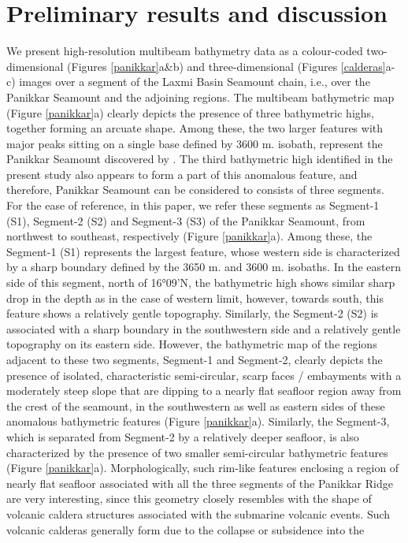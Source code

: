 \documentclass[twocolumn]{article}
\begin{document}
\section{Preliminary results and discussion}
We present high-resolution multibeam bathymetry data as a colour-coded two-dimensional (Figures \ref{panikkar}a\&b) and three-dimensional (Figures \ref{calderas}a-c) images over a segment of the Laxmi Basin Seamount chain, i.e., over the Panikkar Seamount and the adjoining regions. The multibeam bathymetric map (Figure \ref{panikkar}a) clearly depicts the presence of three bathymetric highs, together forming an arcuate shape. Among these, the two larger features with major peaks sitting on a single base defined by 3600 m. isobath, represent the Panikkar Seamount discovered by \cite{Bhattacharya1994b}. The third bathymetric high identified in the present study also appears to form a part of this anomalous feature, and therefore, Panikkar Seamount can be considered to consists of three segments. For the ease of reference, in this paper, we refer these segments as Segment-1 (S1), Segment-2 (S2) and Segment-3 (S3) of the Panikkar Seamount, from northwest to southeast, respectively (Figure \ref{panikkar}a). Among these, the Segment-1 (S1) represents the largest feature, whose western side is characterized by a sharp boundary defined by the 3650 m. and 3600 m. isobaths. In the eastern side of this segment, north of 16°09’N, the bathymetric high shows similar sharp drop in the depth as in the case of western limit, however, towards south, this feature shows a relatively gentle topography. Similarly, the Segment-2 (S2) is associated with a sharp boundary in the southwestern side and a relatively gentle topography on its eastern side. However, the bathymetric map of the regions adjacent to these two segments, Segment-1 and Segment-2, clearly depicts the presence of isolated, characteristic semi-circular, scarp faces / embayments with a moderately steep slope that are dipping to a nearly flat seafloor region away from the crest of the seamount, in the southwestern as well as eastern sides of these anomalous bathymetric features (Figure \ref{panikkar}a). Similarly, the Segment-3, which is separated from Segment-2 by a relatively deeper seafloor, is also characterized by the presence of two smaller semi-circular bathymetric features (Figure \ref{panikkar}a). Morphologically, such rim-like features enclosing a region of nearly flat seafloor associated with all the three segments of the Panikkar Ridge are very interesting, since this geometry closely resembles with the shape of volcanic caldera structures associated with the submarine volcanic events. Such volcanic calderas generally form due to the collapse or subsidence into the \begin{minipage}{\linewidth}%

\end{minipage}
\end{document}
